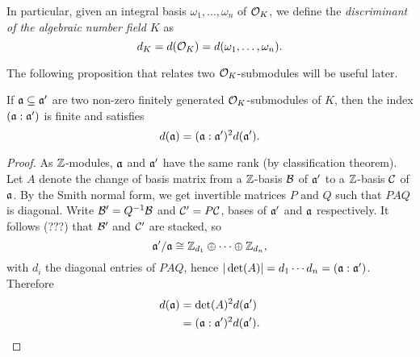 In particular, given an integral basis $\omega_1,\dots,\omega_n$ of $\mathcal{O}_K$, we define the \emph{discriminant of the algebraic number field $K$} as
\[
	d_K = d(\mathcal{O}_K) = d(\omega_1,\dots,\omega_n).
\]


The following proposition that relates two $\mathcal{O}_K$-submodules will be useful later.

\begin{prop}
	If $\mathfrak{a}\subseteq\mathfrak{a}'$ are two non-zero finitely generated $\mathcal{O}_K$-submodules of $K$, then the index $(\mathfrak{a}:\mathfrak{a}')$ is finite and satisfies
	\[
		d(\mathfrak{a}) = (\mathfrak{a}:\mathfrak{a}')^2 d(\mathfrak{a}').
	\]
\end{prop}
\begin{proof}
	As $\mathbb{Z}$-modules, $\mathfrak{a}$ and $\mathfrak{a}'$ have the same rank (by classification theorem). Let $A$ denote the change of basis matrix from a $\mathbb{Z}$-basis $\mathcal{B}$ of $\mathfrak{a}'$ to a $\mathbb{Z}$-basis $\mathcal{C}$ of $\mathfrak{a}$. By the Smith normal form, we get invertible matrices $P$ and $Q$ such that $PAQ$ is diagonal. Write $\mathcal{B}'=Q^{-1}\mathcal{B}$ and $\mathcal{C}'=P\mathcal{C}$, bases of $\mathfrak{a}'$ and $\mathfrak{a}$ respectively. It follows (???) that $\mathcal{B}'$ and $\mathcal{C}'$ are stacked, so
	\[
		\mathfrak{a}'/\mathfrak{a} \cong \mathbb{Z}_{d_1} \oplus \cdots \oplus \mathbb{Z}_{d_n},
	\]
	with $d_i$ the diagonal entries of $PAQ$, hence $|\det(A)|=d_1\cdots d_n=(\mathfrak{a}:\mathfrak{a}')$. Therefore
	\begin{align*}
		d(\mathfrak{a}) &= \det(A)^2 d(\mathfrak{a}')\\
			&= (\mathfrak{a}:\mathfrak{a}')^2 d(\mathfrak{a}').
	\end{align*}
\end{proof}

